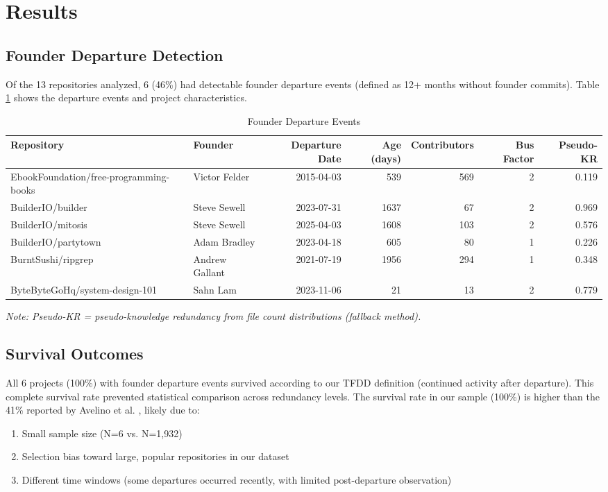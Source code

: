 \documentclass[11pt,letterpaper]{article}
\begin{document}
\section{Results}

\subsection{Founder Departure Detection}

Of the 13 repositories analyzed, 6 (46\%) had detectable founder departure events (defined as 12+ months without founder commits). Table \ref{tab:departure} shows the departure events and project characteristics.

\begin{table}[!htbp]
    \centering
    \caption{Founder Departure Events}
    \label{tab:departure}
    \begin{tabular}{llrrrrr}
        \toprule
        Repository & Founder & Departure Date & Age (days) & Contributors & Bus Factor & Pseudo-KR \\
        \midrule
        EbookFoundation/free-programming-books & Victor Felder & 2015-04-03 & 539 & 569 & 2 & 0.119 \\
        BuilderIO/builder & Steve Sewell & 2023-07-31 & 1637 & 67 & 2 & 0.969 \\
        BuilderIO/mitosis & Steve Sewell & 2025-04-03 & 1608 & 103 & 2 & 0.576 \\
        BuilderIO/partytown & Adam Bradley & 2023-04-18 & 605 & 80 & 1 & 0.226 \\
        BurntSushi/ripgrep & Andrew Gallant & 2021-07-19 & 1956 & 294 & 1 & 0.348 \\
        ByteByteGoHq/system-design-101 & Sahn Lam & 2023-11-06 & 21 & 13 & 2 & 0.779 \\
        \bottomrule
    \end{tabular}
\end{table}

\noindent\textit{Note: Pseudo-KR = pseudo-knowledge redundancy from file count distributions (fallback method).}

\subsection{Survival Outcomes}

All 6 projects (100\%) with founder departure events survived according to our TFDD definition (continued activity after departure). This complete survival rate prevented statistical comparison across redundancy levels. The survival rate in our sample (100\%) is higher than the 41\% reported by Avelino et al. \cite{Avelino2019}, likely due to:
\begin{enumerate}
    \item Small sample size (N=6 vs. N=1,932)
    \item Selection bias toward large, popular repositories in our dataset
    \item Different time windows (some departures occurred recently, with limited post-departure observation)
\end{enumerate}
\end{document}
